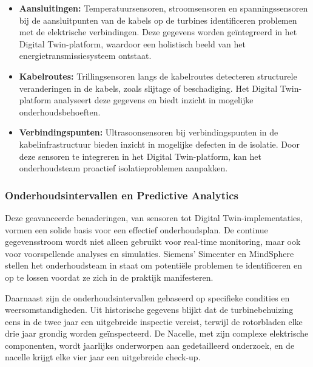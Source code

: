 \begin{itemize}
    \item \textbf{Aansluitingen:} Temperatuursensoren, stroomsensoren en spanningssensoren bij de aansluitpunten van de kabels op de turbines identificeren problemen met de elektrische verbindingen. Deze gegevens worden geïntegreerd in het Digital Twin-platform, waardoor een holistisch beeld van het energietransmissiesysteem ontstaat\cite{siemens-digital-twin,siemens-x-digital-twin,siemens-product-10313567,siemens-product-10045207,siemens-power-quality-measurement}.

    \item \textbf{Kabelroutes:} Trillingsensoren langs de kabelroutes detecteren structurele veranderingen in de kabels, zoals slijtage of beschadiging. Het Digital Twin-platform analyseert deze gegevens en biedt inzicht in mogelijke onderhoudsbehoeften\cite{siemens-digit1al-twin,siemens-x-digital-twin,siemens-product-10313567,siemens-product-10045207,siemens-power-quality-measurement}.
    
    \item \textbf{Verbindingspunten:} Ultrasoonsensoren bij verbindingspunten in de kabelinfrastructuur bieden inzicht in mogelijke defecten in de isolatie. Door deze sensoren te integreren in het Digital Twin-platform, kan het onderhoudsteam proactief isolatieproblemen aanpakken\cite{siemens-digital-twin,siemens-x-digital-twin,siemens-product-10313567,siemens-product-10045207,siemens-power-quality-measurement}.
\end{itemize}

\subsubsection{Onderhoudsintervallen en Predictive Analytics}

Deze geavanceerde benaderingen, van sensoren tot Digital Twin-implementaties\cite{10175262,10269370}, vormen een solide basis voor een effectief onderhoudsplan. De continue gegevensstroom wordt niet alleen gebruikt voor real-time monitoring, maar ook voor voorspellende analyses en simulaties. Siemens' Simcenter en MindSphere stellen het onderhoudsteam in staat om potentiële problemen te identificeren en op te lossen voordat ze zich in de praktijk manifesteren.\cite{5256318}

Daarnaast zijn de onderhoudsintervallen gebaseerd op specifieke condities en weersomstandigheden. Uit historische gegevens blijkt dat de turbinebehuizing eens in de twee jaar een uitgebreide inspectie vereist, terwijl de rotorbladen elke drie jaar grondig worden geïnspecteerd. De Nacelle, met zijn complexe elektrische componenten, wordt jaarlijks onderworpen aan gedetailleerd onderzoek, en de nacelle krijgt elke vier jaar een uitgebreide check-up.\cite{5460911}

